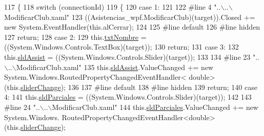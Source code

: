 \begin{DoxyCode}
117                                                                                                 \{
118             \textcolor{keywordflow}{switch} (connectionId)
119             \{
120             \textcolor{keywordflow}{case} 1:
121             
122 \textcolor{preprocessor}{            #line 4 "..\(\backslash\)..\(\backslash\)ModificarClub.xaml"}
123 \textcolor{preprocessor}{}            ((Asistencias\_wpf.ModificarClub)(target)).Closed += \textcolor{keyword}{new} System.EventHandler(\textcolor{keyword}{this}.alCerrar);
124             
125 \textcolor{preprocessor}{            #line default}
126 \textcolor{preprocessor}{}\textcolor{preprocessor}{            #line hidden}
127 \textcolor{preprocessor}{}            \textcolor{keywordflow}{return};
128             \textcolor{keywordflow}{case} 2:
129             this.\hyperlink{class_asistencias__wpf_1_1_modificar_club_aefec4cf6adde6b83050acc590661f212}{txtNombre} = ((System.Windows.Controls.TextBox)(target));
130             \textcolor{keywordflow}{return};
131             \textcolor{keywordflow}{case} 3:
132             this.\hyperlink{class_asistencias__wpf_1_1_modificar_club_a10b87622ef3fad840bb25827b45b6fc6}{sldAssist} = ((System.Windows.Controls.Slider)(target));
133             
134 \textcolor{preprocessor}{            #line 23 "..\(\backslash\)..\(\backslash\)ModificarClub.xaml"}
135 \textcolor{preprocessor}{}            this.\hyperlink{class_asistencias__wpf_1_1_modificar_club_a10b87622ef3fad840bb25827b45b6fc6}{sldAssist}.ValueChanged += \textcolor{keyword}{new} System.Windows.RoutedPropertyChangedEventHandler<\textcolor{keywordtype}{
      double}>(this.\hyperlink{class_asistencias__wpf_1_1_modificar_club_a16e4ed6700460777f30a494ee9eb0680}{sliderChange});
136             
137 \textcolor{preprocessor}{            #line default}
138 \textcolor{preprocessor}{}\textcolor{preprocessor}{            #line hidden}
139 \textcolor{preprocessor}{}            \textcolor{keywordflow}{return};
140             \textcolor{keywordflow}{case} 4:
141             this.\hyperlink{class_asistencias__wpf_1_1_modificar_club_a8333d2f10cd950124c2de671a73fd288}{sldParciales} = ((System.Windows.Controls.Slider)(target));
142             
143 \textcolor{preprocessor}{            #line 24 "..\(\backslash\)..\(\backslash\)ModificarClub.xaml"}
144 \textcolor{preprocessor}{}            this.\hyperlink{class_asistencias__wpf_1_1_modificar_club_a8333d2f10cd950124c2de671a73fd288}{sldParciales}.ValueChanged += \textcolor{keyword}{new} System.Windows.
      RoutedPropertyChangedEventHandler<\textcolor{keywordtype}{double}>(this.\hyperlink{class_asistencias__wpf_1_1_modificar_club_a16e4ed6700460777f30a494ee9eb0680}{sliderChange});

\end{DoxyCode}
